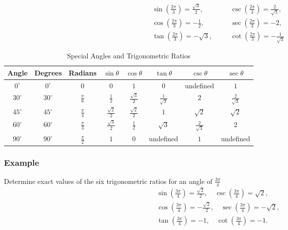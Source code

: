 \documentclass{article}
\begin{document}
\begin{align*}
&\sin \left(\frac{2 \pi}{3}\right) = \frac{\sqrt{3}}{2}, \quad &
&\csc \left(\frac{2 \pi}{3}\right) = \frac{2}{\sqrt{3}}, \\
&\cos \left(\frac{2 \pi}{3}\right) = -\frac{1}{2}, \quad &
&\sec \left(\frac{2 \pi}{3}\right) = -2, \\
&\tan \left(\frac{2 \pi}{3}\right) = -\sqrt{3}, \quad &
&\cot \left(\frac{2 \pi}{3}\right) = -\frac{1}{\sqrt{3}}
\end{align*}


\begin{table}[htbp]
\centering
\caption{Special Angles and Trigonometric Ratios}
\label{tab:special_angles}
\begin{tabular}{|c|c|c|c|c|c|c|c|}
\hline
Angle & Degrees & Radians & \( \sin \theta \) & \( \cos \theta \) & \( \tan \theta \) & \( \csc \theta \) & \( \sec \theta \) \\ \hline
\( 0^\circ \) & \( 0^\circ \) & \( 0 \) & \( 0 \) & \( 1 \) & \( 0 \) & undefined & \( 1 \) \\ \hline
\( 30^\circ \) & \( 30^\circ \) & \( \frac{\pi}{6} \) & \( \frac{1}{2} \) & \( \frac{\sqrt{3}}{2} \) & \( \frac{1}{\sqrt{3}} \) & \( 2 \) & \( \frac{2}{\sqrt{3}} \) \\ \hline
\( 45^\circ \) & \( 45^\circ \) & \( \frac{\pi}{4} \) & \( \frac{\sqrt{2}}{2} \) & \( \frac{\sqrt{2}}{2} \) & \( 1 \) & \( \sqrt{2} \) & \( \sqrt{2} \) \\ \hline
\( 60^\circ \) & \( 60^\circ \) & \( \frac{\pi}{3} \) & \( \frac{\sqrt{3}}{2} \) & \( \frac{1}{2} \) & \( \sqrt{3} \) & \( \frac{2}{\sqrt{3}} \) & \( 2 \) \\ \hline
\( 90^\circ \) & \( 90^\circ \) & \( \frac{\pi}{2} \) & \( 1 \) & \( 0 \) & undefined & \( 1 \) & undefined \\ \hline
\end{tabular}
\end{table}
\subsubsection*{Example}
Determine exact values of the six trigonometric ratios for an angle of $\frac{3 \pi}{4}$
\begin{align*}
&\sin \left(\frac{3\pi}{4}\right) = \frac{\sqrt{2}}{2}, \quad \csc \left(\frac{3\pi}{4}\right) = \sqrt{2}, \\
&\cos \left(\frac{3\pi}{4}\right) = -\frac{\sqrt{2}}{2}, \quad \sec \left(\frac{3\pi}{4}\right) = -\sqrt{2}, \\
&\tan \left(\frac{3\pi}{4}\right) = -1, \quad \cot \left(\frac{3\pi}{4}\right) = -1.
\end{align*}
\end{document}
